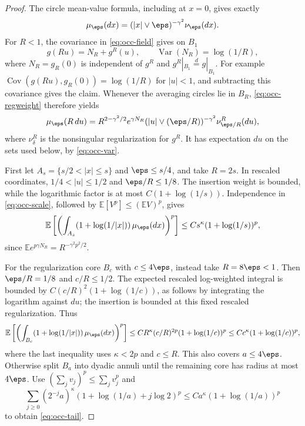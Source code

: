 \begin{proof}
The circle mean-value formula, including at $x=0$, gives exactly
\begin{equation}\label{eq:occ-regweight}
 \mu_\eps(dx)=(|x|\vee\eps)^{-\gamma^2}\nu_\eps(dx).
\end{equation}
For $R<1$, the covariance in \eqref{eq:occ-field} gives on $B_1$
\[
 g(Ru)=N_R+g^R(u),\qquad
 \operatorname{Var}(N_R)=\log(1/R),
\]
where $N_R=g_R(0)$ is independent of $g^R$ and
$g^R|_{B_1}\overset{d}{=}g|_{B_1}$.
For example $\operatorname{Cov}(g(Ru),g_R(0))=\log(1/R)$ for
$|u|<1$, and subtracting this covariance gives the claim.
Whenever the averaging circles lie in $B_R$, \eqref{eq:occ-regweight}
therefore yields
\begin{equation}\label{eq:occ-scale}
 \mu_\eps(R\,du)
   =R^{2-\gamma^2/2}e^{\gamma N_R}
       (|u|\vee(\eps/R))^{-\gamma^2}\nu^R_{\eps/R}(du),
\end{equation}
where $\nu^R_\delta$ is the nonsingular regularization for $g^R$.
It has expectation $du$ on the sets used below, by \eqref{eq:occ-var}.

First let $A_s=\{s/2<|x|\leq s\}$ and $\eps\leq s/4$, and take
$R=2s$. In rescaled coordinates, $1/4<|u|\leq1/2$ and
$\eps/R\leq1/8$. The insertion weight is bounded, while the
logarithmic factor is at most $C(1+\log(1/s))$.
Independence in \eqref{eq:occ-scale}, followed by
$\mathbb{E}[V^p]\leq(\mathbb{E} V)^p$, gives
\[
 \mathbb{E}\left[\left(\int_{A_s}(1+\log(1/|x|))\,\mu_\eps(dx)\right)^p\right]
  \leq C s^\kappa(1+\log(1/s))^p,
\]
since $\mathbb{E} e^{p\gamma N_R}=R^{-\gamma^2p^2/2}$.

For the regularization core $B_c$ with $c\leq4\eps$, instead take
$R=8\eps<1$. Then $\eps/R=1/8$ and $c/R\leq1/2$.
The expected rescaled log-weighted integral is bounded by
$C(c/R)^2(1+\log(1/c))$, as follows by integrating the logarithm
against $du$; the insertion is bounded at this fixed rescaled
regularization. Thus
\[
 \mathbb{E}\left[\left(\int_{B_c}(1+\log(1/|x|))\,\mu_\eps(dx)\right)^p\right]
 \leq C R^\kappa(c/R)^{2p}(1+\log(1/c))^p
 \leq C c^\kappa(1+\log(1/c))^p,
\]
where the last inequality uses $\kappa<2p$ and $c\leq R$.
This also covers $a\leq4\eps$. Otherwise split $B_a$ into dyadic
annuli until the remaining core has radius at most $4\eps$.
Use $(\sum_j v_j)^p\leq\sum_j v_j^p$ and
\[
 \sum_{j\geq0}(2^{-j}a)^\kappa
       (1+\log(1/a)+j\log2)^p
       \leq C a^\kappa(1+\log(1/a))^p
\]
to obtain \eqref{eq:occ-tail}.
\end{proof}

